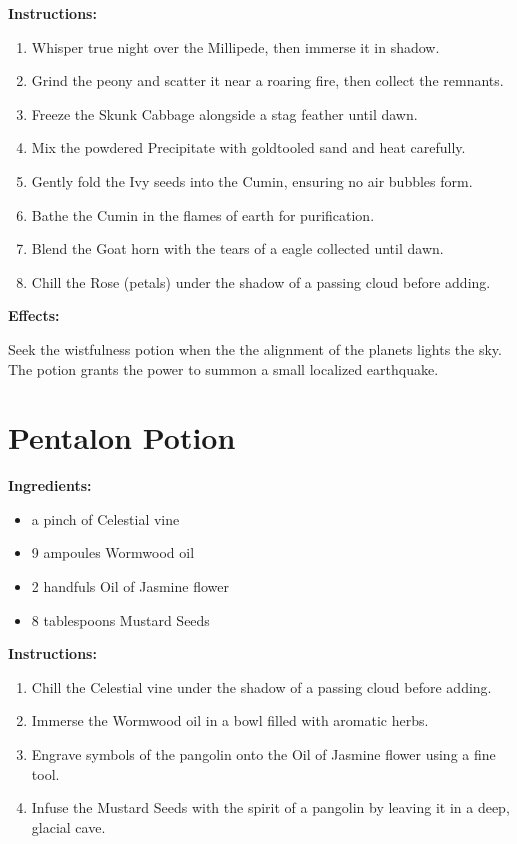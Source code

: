 \documentclass{article}
\begin{document}
\textbf{Instructions:}

\begin{enumerate}
  \item Whisper true night over the Millipede, then immerse it in shadow.
  \item Grind the peony and scatter it near a roaring fire, then collect the remnants.
  \item Freeze the Skunk Cabbage alongside a stag feather until dawn.
  \item Mix the powdered Precipitate with goldtooled sand and heat carefully.
  \item Gently fold the Ivy seeds into the Cumin, ensuring no air bubbles form.
  \item Bathe the Cumin in the flames of earth for purification.
  \item Blend the Goat horn with the tears of a eagle collected until dawn.
  \item Chill the Rose (petals) under the shadow of a passing cloud before adding.
\end{enumerate}

\textbf{Effects:}

Seek the wistfulness potion when the the alignment of the planets lights the sky. The potion grants the power to summon a small localized earthquake.

\newpage
\section*{Pentalon Potion}

\textbf{Ingredients:}

\begin{itemize}
  \item a pinch of Celestial vine
  \item 9 ampoules Wormwood oil
  \item 2 handfuls Oil of Jasmine flower
  \item 8 tablespoons Mustard Seeds
\end{itemize}

\textbf{Instructions:}

\begin{enumerate}
  \item Chill the Celestial vine under the shadow of a passing cloud before adding.
  \item Immerse the Wormwood oil in a bowl filled with aromatic herbs.
  \item Engrave symbols of the pangolin onto the Oil of Jasmine flower using a fine tool.
  \item Infuse the Mustard Seeds with the spirit of a pangolin by leaving it in a deep, glacial cave.
\end{enumerate}
\end{document}
